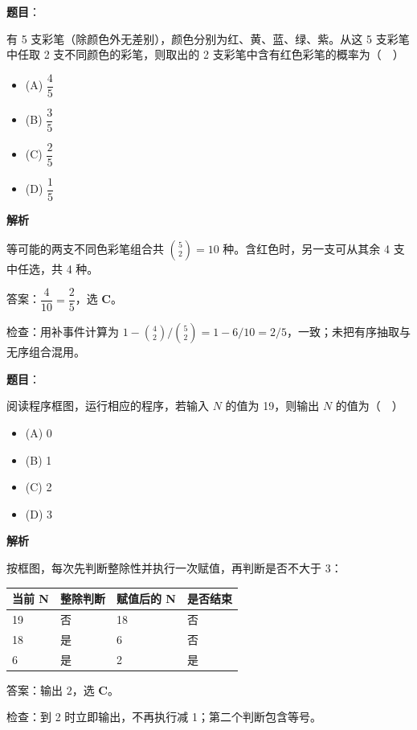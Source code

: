 \begin{answer}

\textbf{题目}：

有 5 支彩笔（除颜色外无差别），颜色分别为红、黄、蓝、绿、紫。从这 5 支彩笔中任取 2 支不同颜色的彩笔，则取出的 2 支彩笔中含有红色彩笔的概率为（　）

\begin{itemize}
\item (A) $\dfrac45$
\item (B) $\dfrac35$
\item (C) $\dfrac25$
\item (D) $\dfrac15$
\end{itemize}

\textbf{解析}

等可能的两支不同色彩笔组合共 $\binom52=10$ 种。含红色时，另一支可从其余 4 支中任选，共 4 种。

答案：$\dfrac4{10}=\boxed{\dfrac25}$，选 \textbf{C}。

检查：用补事件计算为 $1-\binom42/\binom52=1-6/10=2/5$，一致；未把有序抽取与无序组合混用。


\end{answer}
\begin{answer}

\textbf{题目}：

阅读程序框图，运行相应的程序，若输入 $N$ 的值为 19，则输出 $N$ 的值为（　）
\nopagebreak[4]
\begin{center}\end{center}
\nopagebreak[4]
\begin{itemize}
\item (A) 0
\item (B) 1
\item (C) 2
\item (D) 3
\end{itemize}

\textbf{解析}

按框图，每次先判断整除性并执行一次赋值，再判断是否不大于 3：

\begin{center}
\begin{tabular}{llll}
\toprule
当前 N & 整除判断 & 赋值后的 N & 是否结束 \\
\midrule
19 & 否 & 18 & 否 \\
18 & 是 & 6 & 否 \\
6 & 是 & 2 & 是 \\
\bottomrule
\end{tabular}
\end{center}

答案：输出 $\boxed2$，选 \textbf{C}。

检查：到 2 时立即输出，不再执行减 1；第二个判断包含等号。


\end{answer}
